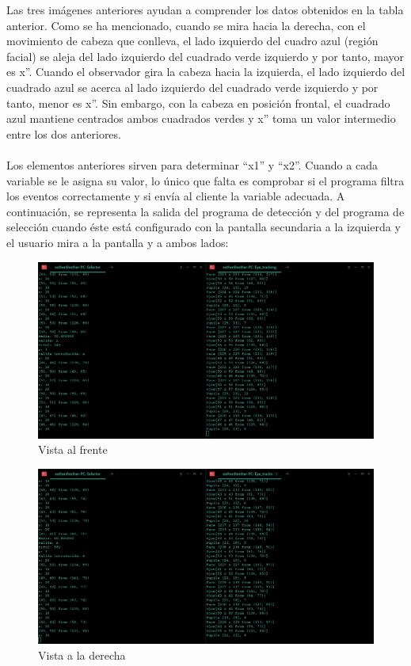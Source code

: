 Las tres imágenes anteriores ayudan a comprender los datos obtenidos en la tabla anterior. Como se ha mencionado, cuando se mira hacia la derecha, con el movimiento de cabeza que conlleva, el lado izquierdo del cuadro azul (región facial) se aleja del lado izquierdo del cuadrado verde izquierdo y por tanto, mayor es x''. Cuando el observador gira la cabeza hacia la izquierda, el lado izquierdo del cuadrado azul se acerca al lado izquierdo del cuadrado verde izquierdo y por tanto, menor es x''. Sin embargo, con la cabeza en posición frontal, el cuadrado azul mantiene centrados ambos cuadrados verdes y x'' toma un valor intermedio entre los dos anteriores. \\ \\

Los elementos anteriores sirven para determinar ``x1'' y ``x2''. Cuando a cada variable se le asigna su valor, lo único que falta es comprobar si el programa filtra los eventos correctamente y si envía al cliente la variable adecuada. A continuación, se representa la salida del programa de detección y del programa de selección cuando éste está configurado con la pantalla secundaria a la izquierda y el usuario mira a la pantalla y a ambos lados:

    \begin{figure}
    \centering
    \includegraphics[scale = 0.4]{capitulo_04/figuras_dir/ldcentro.jpg}
    \caption{Vista al frente}
    \end{figure}

    \begin{figure}
    \centering
    \includegraphics[scale = 0.4]{capitulo_04/figuras_dir/ldder.jpg}
    \caption{Vista a la derecha}
    \end{figure}


